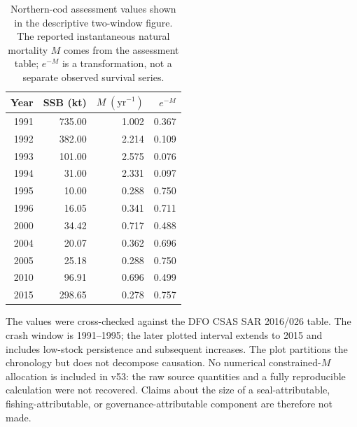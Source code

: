 \begin{table}[htbp]
\centering\small
\caption{Northern-cod assessment values shown in the descriptive two-window figure. The reported instantaneous natural mortality \(M\) comes from the assessment table; \(e^{-M}\) is a transformation, not a separate observed survival series.}
\label{tab:cod-values}
\begin{tabular}{@{}rrrr@{}}
\toprule Year & SSB (kt) & \(M\;(\mathrm{yr}^{-1})\) & \(e^{-M}\) \\
\midrule
1991 & 735.00 & 1.002 & 0.367 \\
1992 & 382.00 & 2.214 & 0.109 \\
1993 & 101.00 & 2.575 & 0.076 \\
1994 & 31.00 & 2.331 & 0.097 \\
1995 & 10.00 & 0.288 & 0.750 \\
1996 & 16.05 & 0.341 & 0.711 \\
2000 & 34.42 & 0.717 & 0.488 \\
2004 & 20.07 & 0.362 & 0.696 \\
2005 & 25.18 & 0.288 & 0.750 \\
2010 & 96.91 & 0.696 & 0.499 \\
2015 & 298.65 & 0.278 & 0.757 \\
\bottomrule
\end{tabular}
\end{table}

The values were cross-checked against the DFO CSAS SAR 2016/026 table. The crash window is 1991--1995; the later plotted interval extends to 2015 and includes low-stock persistence and subsequent increases. The plot partitions the chronology but does not decompose causation. No numerical constrained-\(M\) allocation is included in v53: the raw source quantities and a fully reproducible calculation were not recovered. Claims about the size of a seal-attributable, fishing-attributable, or governance-attributable component are therefore not made.

